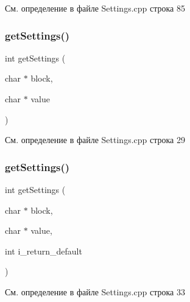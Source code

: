 См. определение в файле Settings.\+cpp строка 85

\mbox{\label{group__settingscpp_ga68b4d9ed6be7aaa93d9a6fe8fd683862}} 
\subsubsection{\texorpdfstring{get\+Settings()}{getSettings()}\hspace{0.1cm}{\footnotesize\ttfamily [1/2]}}
{\footnotesize\ttfamily int get\+Settings (\begin{DoxyParamCaption}\item[{char $\ast$}]{block,  }\item[{char $\ast$}]{value }\end{DoxyParamCaption})}



См. определение в файле Settings.\+cpp строка 29

\mbox{\label{group__settingscpp_ga0a2fe94de4037eda33c49fe332970891}} 
\subsubsection{\texorpdfstring{get\+Settings()}{getSettings()}\hspace{0.1cm}{\footnotesize\ttfamily [2/2]}}
{\footnotesize\ttfamily int get\+Settings (\begin{DoxyParamCaption}\item[{char $\ast$}]{block,  }\item[{char $\ast$}]{value,  }\item[{int}]{i\+\_\+return\+\_\+default }\end{DoxyParamCaption})}



См. определение в файле Settings.\+cpp строка 33

\mbox{\label{group__settingscpp_ga50535cebf45c8d7cbffd29274699e5f5}} 
